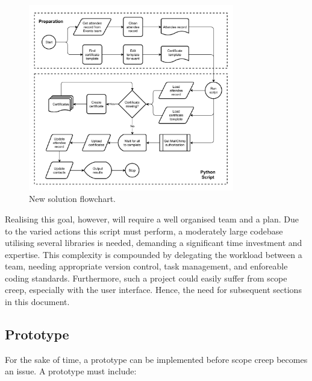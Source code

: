 \documentclass[11pt]{article}
\begin{document}
\begin{figure}[b!]
    \centering
    \includegraphics[width=0.8\textwidth]{figures/new_solution.pdf}
    \caption{New solution flowchart.}
    \label{fig:new-solution}
\end{figure}

Realising this goal, however, will require a well organised team and a plan. Due to the varied actions this script must perform, a moderately large codebase utilising several libraries is needed, demanding a significant time investment and expertise. This complexity is compounded by delegating the workload between a team, needing appropriate version control, task management, and enforeable coding standards. Furthermore, such a project could easily suffer from scope creep, especially with the user interface. Hence, the need for subsequent sections in this document.

\subsection{Prototype}

For the sake of time, a prototype can be implemented before scope creep becomes an issue. A prototype must include:
\end{document}

